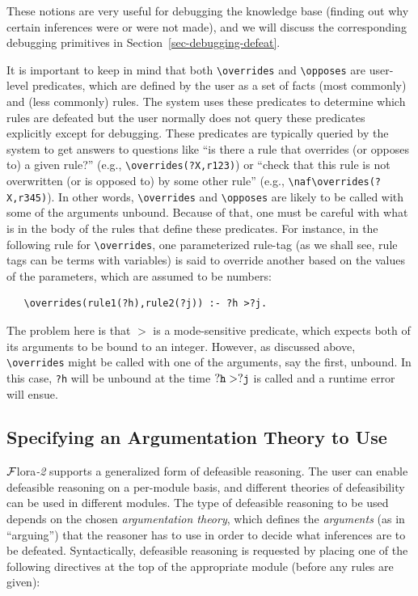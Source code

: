 \documentclass[11pt]{article}
\newcommand{\FLORA}{{\mbox{\sc ${\cal F}${lora}\rm\emph{-2}}}\xspace}
\newcommand{\FLSYSTEM}{\FLORA}
\newcommand{\bs}{\textbackslash}
\newcommand{\RULELOGNAF}{{\texttt{{\bs}naf}}\xspace}
\begin{document}
These notions are very useful for debugging the knowledge base (finding out why
certain inferences were or were not made), and we will discuss the
corresponding debugging primitives in Section~\ref{sec-debugging-defeat}.

It is important to keep in mind that both \texttt{\bs{}overrides} and
\texttt{\bs{}opposes} are user-level predicates, which are defined by the
user as a set of facts (most commonly) and (less commonly) rules. The
system uses these predicates to determine which rules are defeated but the
user normally does not query these predicates explicitly except for
debugging.  These predicates are typically queried by the system to get
answers to questions like ``is there a rule that overrides (or opposes to)
a given rule?'' (e.g., \texttt{\bs{}overrides(?X,r123)}) or
``check that this rule is not overwritten (or is opposed to) by some other
rule'' (e.g., \texttt{\RULELOGNAF\bs{}overrides(?X,r345)}).
In other words, \texttt{\bs{}overrides} and \texttt{\bs{}opposes} are
likely to be called with some of the arguments unbound.
Because of that, one must be careful with what is in the body of the rules
that define these predicates. For instance, in the following rule for
\texttt{\bs{}overrides}, one parameterized rule-tag (as we shall see, rule
tags can be terms with variables) is said to override
another based on the values of the parameters, which are assumed to be
numbers:
\begin{verbatim}
   \overrides(rule1(?h),rule2(?j)) :- ?h >?j.
\end{verbatim}
The problem here is that $>$ is a mode-sensitive predicate, which expects
both of its arguments to be bound to an integer. However, as discussed above,
\texttt{\bs{}overrides} might be called with one of the arguments, say
the first, unbound. In this case, \texttt{?h} will be unbound at the time
$\tt ?h>?j$ is called and a runtime error will ensue. 


\subsection{Specifying an Argumentation Theory to Use}

\FLSYSTEM supports a generalized form of defeasible reasoning.
The user can enable defeasible reasoning on a per-module basis, and
different theories of defeasibility can be used in different modules.
The type of defeasible reasoning to be used depends on the chosen
\emph{argumentation theory}, which defines the \emph{arguments} (as in
``arguing'') that the reasoner has to use in order to decide what inferences
are to be defeated. Syntactically, defeasible reasoning is requested
by placing one of the following directives at the top of the
appropriate module (before any rules are given):
\end{document}
